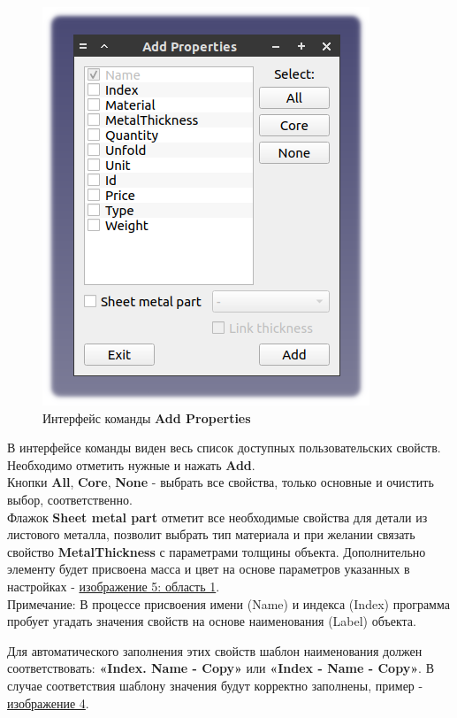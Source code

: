 \documentclass[a4paper,12pt]{article}
\begin{document}
\begin{figure}[htp]
\centering
\includegraphics[scale=0.8]{img/properties_add.png}
\caption{Интерфейс команды \textbf{Add Properties}}
\label{sec:properties_add}
\end{figure}

В интерфейсе команды виден весь список доступных пользовательских свойств. Необходимо отметить нужные и нажать \textbf{Add}.\\

Кнопки \textbf{All}, \textbf{Core}, \textbf{None} - выбрать все свойства, только основные и очистить выбор, соответственно.\\

Флажок \textbf{Sheet metal part} отметит все необходимые свойства для детали из листового металла, позволит выбрать тип материала и при желании связать свойство \textbf{MetalThickness} с параметрами толщины объекта. Дополнительно элементу будет присвоена масса и цвет на основе параметров указанных в настройках - \hyperref[sec:pref_sm]{изображение 5: область 1}.\\

Примечание: В процессе присвоения имени (Name) и индекса (Index) программа пробует угадать значения свойств на основе наименования (Label) объекта.

Для автоматического заполнения этих свойств шаблон наименования должен соответствовать: \textbf{«Index. Name - Copy»} или \textbf{«Index - Name - Copy»}. В случае соответствия шаблону значения будут корректно заполнены, пример - \hyperref[sec:properties]{изображение 4}.
\end{document}
